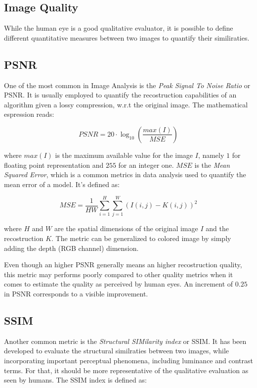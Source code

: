 \documentclass[12pt,a4paper]{report}
\begin{document}
\subsection{Image Quality}

While the human eye is a good qualitative evaluator, it is possible to define different quantitative measures between two images to quantify their similiraties.

\subsection*{PSNR}

One of the most common in Image Analysis is the {\it Peak Signal To Noise Ratio} or PSNR. 
It is usually employed to quantify the recostruction capabilities of an algorithm given a lossy compression, w.r.t the original image. The mathematical espression reads: 

\begin{equation}
 PSNR = 20 \cdot \log_{10} (\frac{max(I)}{MSE})
\end{equation}

where $max(I)$ is the maximum available value for the image $I$, namely $1$ for floating point representation and $255$ for an integer one. 
$MSE$ is the {\it Mean Squared Error}, which is a common metrics in data analysis used to quantify the mean error of a model. It's defined as:

\begin{equation}
 MSE = \frac{1}{HW}\sum_{i=1}^{H} \sum_{j=1}^W (I(i, j) - K(i,j))^2
\end{equation}
 
where $H$ and $W$ are the spatial dimensions of the original image $I$ and the recostruction $K$. 
The metric can be generalized to colored image by simply adding the depth (RGB channel) dimension.

Even though an higher PSNR generally means an higher recostruction quality, this metric may performs poorly compared to other quality metrics when it comes to estimate the quality as perceived by human eyes. An increment of $0.25$ in PSNR corresponds to a visible improvement.
 
\subsection*{SSIM}

Another common metric is the {\it Structural SIMilarity index} or SSIM. It has been developed to evaluate the structural similraties between two images,  while incorporating important perceptual phenomena, including luminance and contrast terms. For that, it should be more representative of the qualitative evaluation as seen by humans.
The SSIM index is defined as: 
\end{document}
